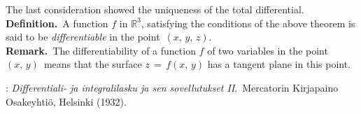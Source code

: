 \documentclass[12pt]{article}
\theoremstyle{definition}
\begin{document}
The last consideration showed the uniqueness of the total differential.\\

\textbf{Definition.}\, A function $f$ in $\mathbb{R}^3$, satisfying the conditions of the above theorem is said to be \emph{differentiable} in the point\, $(x,\,y,\,z)$.\\


\textbf{Remark.}\, The differentiability of a function $f$ of two variables in the point\, $(x,\,y)$\, means that the surface \;$z \,=\, f(x,\,y)$\; has a tangent plane in this point.

\begin{thebibliography}{8}
: {\em Differentiali- ja integralilasku
ja sen sovellutukset II}.\, Mercatorin Kirjapaino Osakeyhti\"o, Helsinki (1932).
\end{thebibliography} 

\end{document}
